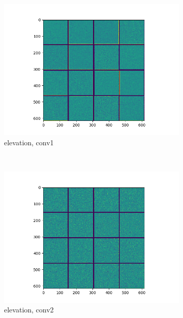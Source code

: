 \documentclass[11pt,a4paper]{article}
\begin{document}
\begin{figure}[t]
    \centering
    \begin{subfigure}[b]{0.2\textwidth}
        \includegraphics[width=\textwidth]{graphics/nn_visualisation/convnet_filters_elevation_conv2d.png}
        \caption{elevation, conv1}
    \end{subfigure}
    ~
    \begin{subfigure}[b]{0.2\textwidth}
        \includegraphics[width=\textwidth]{graphics/nn_visualisation/convnet_filters_elevation_conv2d_1.png}
        \caption{elevation, conv2}
    \end{subfigure}
    ~
    \begin{subfigure}[b]{0.2\textwidth}

\end{subfigure}
\end{figure}
\end{document}
